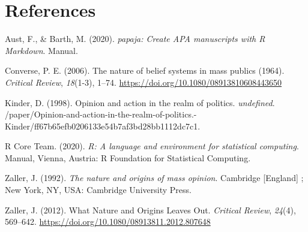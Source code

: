 \documentclass[
  english,
  man]{apa6}
\begin{document}
\newpage

\hypertarget{references}{%
\section{References}\label{references}}

\begingroup
\setlength{\parindent}{-0.5in}
\setlength{\leftskip}{0.5in}

\hypertarget{refs}{}
\leavevmode\hypertarget{ref-R-papaja}{}%
Aust, F., \& Barth, M. (2020). \emph{papaja: Create APA manuscripts with R Markdown}. Manual.

\leavevmode\hypertarget{ref-converseNatureBeliefSystems2006}{}%
Converse, P. E. (2006). The nature of belief systems in mass publics (1964). \emph{Critical Review}, \emph{18}(1-3), 1--74. \url{https://doi.org/10.1080/08913810608443650}

\leavevmode\hypertarget{ref-kinderOpinionActionRealm1998}{}%
Kinder, D. (1998). Opinion and action in the realm of politics. \emph{undefined}. /paper/Opinion-and-action-in-the-realm-of-politics.-Kinder/ff67b65efb0206133e54b7af3bd28bb1112dc7c1.

\leavevmode\hypertarget{ref-R-base}{}%
R Core Team. (2020). \emph{R: A language and environment for statistical computing}. Manual, Vienna, Austria: R Foundation for Statistical Computing.

\leavevmode\hypertarget{ref-zallerNatureOriginsMass1992}{}%
Zaller, J. (1992). \emph{The nature and origins of mass opinion}. Cambridge {[}England{]} ; New York, NY, USA: Cambridge University Press.

\leavevmode\hypertarget{ref-zallerWhatNatureOrigins2012}{}%
Zaller, J. (2012). What Nature and Origins Leaves Out. \emph{Critical Review}, \emph{24}(4), 569--642. \url{https://doi.org/10.1080/08913811.2012.807648}

\endgroup
\end{document}
